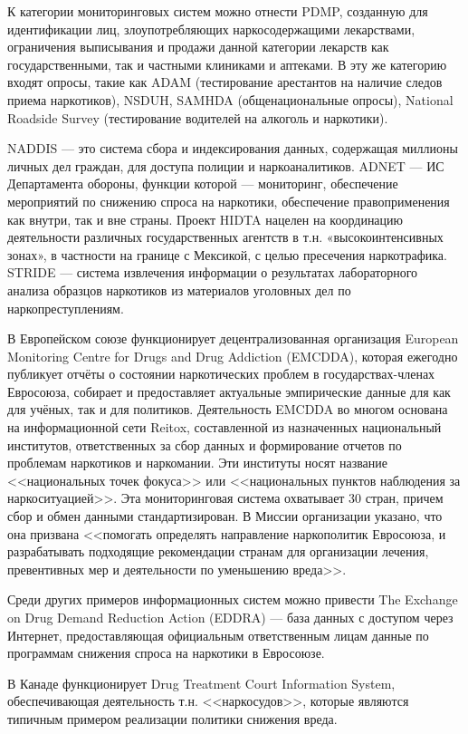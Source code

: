 К категории мониторинговых систем можно отнести PDMP, созданную для 
идентификации лиц, злоупотребляющих наркосодержащими лекарствами, ограничения 
выписывания и продажи данной категории лекарств как государственными, так и 
частными клиниками и аптеками. В эту же категорию входят опросы, такие как ADAM 
(тестирование арестантов на наличие следов приема наркотиков), NSDUH, SAMHDA 
(общенациональные опросы),  National Roadside Survey (тестирование водителей на 
алкоголь и наркотики). 

NADDIS — это система сбора и индексирования данных, содержащая миллионы личных 
дел граждан, для доступа полиции и наркоаналитиков. ADNET — ИС Департамента 
обороны, функции которой — мониторинг, обеспечение мероприятий по снижению 
спроса на наркотики, обеспечение правоприменения как внутри, так и вне страны. 
Проект HIDTA нацелен на координацию деятельности различных государственных 
агентств в т.н. «высокоинтенсивных зонах», в частности на границе с Мексикой, с 
целью пресечения наркотрафика. STRIDE — система извлечения информации о
результатах лабораторного анализа образцов наркотиков из материалов уголовных 
дел по наркопреступлениям.

В Европейском союзе функционирует децентрализованная организация European 
Monitoring Centre for Drugs and Drug Addiction (EMCDDA), которая ежегодно 
публикует отчёты о состоянии наркотических проблем в государствах-членах 
Евросоюза, собирает и предоставляет актуальные эмпирические данные для как для 
учёных, так и для политиков. Деятельность EMCDDA во многом основана на 
информационной сети Reitox, составленной из назначенных национальный институтов, 
ответственных за сбор данных и формирование отчетов по проблемам наркотиков и 
наркомании.  Эти институты носят название <<национальных точек фокуса>> или 
<<национальных пунктов наблюдения за наркоситуацией>>. Эта мониторинговая 
система охватывает 30 стран, причем сбор и обмен данными стандартизирован. В 
Миссии организации указано, что она призвана <<помогать определять направление 
наркополитик Евросоюза, и разрабатывать подходящие рекомендации странам для 
организации лечения, превентивных мер и деятельности по уменьшению вреда>>.

Среди других примеров информационных систем можно привести The Exchange on Drug 
Demand Reduction Action (EDDRA) --- база данных с доступом через Интернет, 
предоставляющая официальным ответственным лицам данные по программам снижения 
спроса на наркотики в Евросоюзе.

В Канаде функционирует Drug Treatment Court Information System, обеспечивающая 
деятельность т.н. <<наркосудов>>, которые являются типичным примером реализации 
политики снижения вреда.

